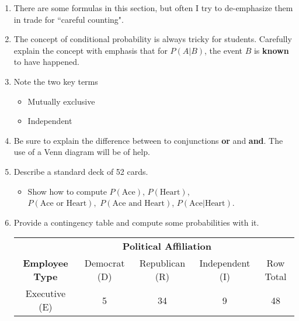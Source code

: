 \documentclass{article}
\begin{document}
\begin{enumerate}

    \item There are some formulas in this section, but often I try to de-emphasize them in trade for ``careful counting".
    
    \item The concept of conditional probability is always tricky for students. Carefully explain the concept with emphasis that for $P(A | B)$, the event $B$ is \textbf{known} to have happened.
    
    \item Note the two key terms
    
        \begin{itemize}
        
            \item Mutually exclusive
            
            \item Independent
            
        \end{itemize}
        
    \item Be sure to explain the difference between to conjunctions \textbf{or} and \textbf{and}. The use of a Venn diagram will be of help.
    
    \item Describe a standard deck of 52 cards.
    
        \begin{itemize}
        
            \item Show how to compute $P(\mbox{Ace})$, $P(\mbox{Heart})$, \\ $P(\mbox{Ace or Heart}),$ $P(\mbox{Ace and Heart})$, $P(\mbox{Ace} | \mbox{Heart})$.
            
        \end{itemize}
        
    \item Provide a contingency table and compute some probabilities with it. 
    
    \renewcommand{\arraystretch}{1.2}
    
	\begin{center}
	
	\begin{tabular}{ccccc}
	& \multicolumn{3}{c}{\textbf{Political Affiliation}} \\ \cline{2-4}
	{\textbf{ Employee Type}} & Democrat (D) & Republican (R) & Independent (I) & Row Total\\	\hline
	Executive (E) \hfill& 5 & 34 & 9 & 48 \\
	

\end{tabular}
\end{center}
\end{enumerate}
\end{document}
